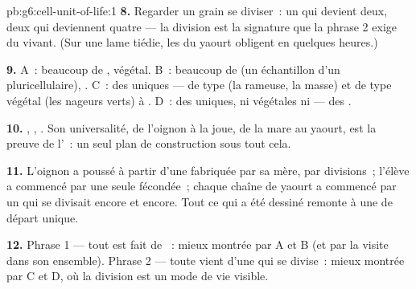 \begin{solution}{pb:g6:cell-unit-of-life:1}
\textbf{8.} Regarder un grain se diviser~: un qui devient deux, deux
qui deviennent quatre --- la division est la signature que la phrase
2 exige du vivant. (Sur une lame tiédie, les  du yaourt
obligent en quelques heures.)

\textbf{9.} A~: beaucoup de , végétal. B~: beaucoup de
 (un échantillon d'un  pluricellulaire), . C~:
des  uniques --- de type  (la rameuse, la masse) et de
type végétal (les nageurs verts)  à . D~: des 
uniques, ni végétales ni  --- des .

\textbf{10.} , , . Son universalité, de
l'oignon à la joue, de la mare au yaourt, est la preuve de l'~: un seul plan de construction sous tout cela.

\textbf{11.} L'oignon a poussé à partir d'une  fabriquée par
sa  mère, par divisions~; l'élève a commencé par une seule
 fécondée~; chaque chaîne de yaourt a commencé par un
 qui se divisait encore et encore. Tout ce qui a été dessiné
remonte à une  de départ unique.

\textbf{12.} Phrase 1 --- tout  est fait de ~:
mieux montrée par A et B (et par la visite dans son ensemble).
Phrase 2 --- toute  vient d'une  qui se divise~: mieux
montrée par C et D, où la division est un mode de vie visible.
\end{solution}
